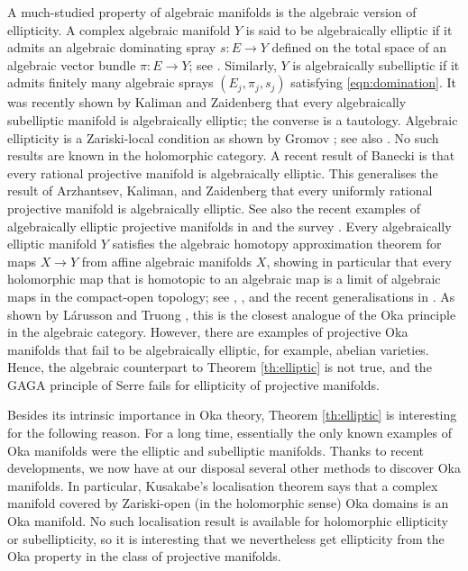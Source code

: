 \documentclass[12pt]{amsart}
\theoremstyle{definition}
\numberwithin{equation}{section}
\numberwithin{figure}{section}
\numberwithin{equation}{section}
\begin{document}
%
%
A much-studied property of algebraic manifolds
is the algebraic version of ellipticity.
A complex algebraic manifold $Y$ is said to be algebraically
elliptic if it admits an algebraic dominating spray $s:E\to Y$
defined on the total space of an algebraic vector bundle
$\pi:E\to Y$; see \cite[Definition 5.6.13 (e)]{Forstneric2017E}.
Similarly, $Y$ is algebraically subelliptic if it admits 
finitely many algebraic sprays $(E_j,\pi_j,s_j)$ satisfying 
\eqref{eqn:domination}. It was recently shown by Kaliman and Zaidenberg
\cite{KalimanZaidenberg2024FM} that every algebraically subelliptic 
manifold is algebraically elliptic; the converse is a tautology. 
Algebraic ellipticity is a Zariski-local condition as shown by 
Gromov \cite[3.5.B, 3.5.C]{Gromov1989}; see also 
\cite[Proposition 6.4.2]{Forstneric2017E}.
No such results are known in the holomorphic category.
A recent result of Banecki \cite{Banecki2024X} is that 
every rational projective manifold is algebraically elliptic.
This generalises the result of Arzhantsev, Kaliman, and Zaidenberg 
\cite[Theorem 1.3]{ArzhantsevKalimanZaidenberg2024}
that every uniformly rational projective manifold is algebraically
elliptic. See also the recent examples of algebraically elliptic
projective manifolds in 
\cite{KalimanZaidenberg2024MRL,KalimanZaidenberg2025}
and the survey \cite{Zaidenberg2024ellipticitysurvey}.
Every algebraically elliptic manifold $Y$ satisfies the algebraic 
homotopy approximation theorem for maps $X\to Y$ from 
affine algebraic manifolds $X$,
showing in particular that every holomorphic map that is homotopic
to an algebraic map is a limit of algebraic maps in the compact-open
topology; see \cite[Theorem 3.1]{Forstneric2006AJM}, 
\cite[Theorem 6.15.1]{Forstneric2017E}, and the recent 
generalisations in \cite[Sect.\ 2]{AlarconForstnericLarusson2024}.
As shown by L\'arusson and Truong \cite{LarussonTruong2019},
this is the closest analogue of the Oka principle in the algebraic
category. However, there are examples of projective Oka manifolds 
that fail to be algebraically elliptic, for example, abelian varieties. 
Hence, the algebraic counterpart
to Theorem \ref{th:elliptic} is not true, and the GAGA principle
of Serre \cite{Serre1955AIF} fails for ellipticity of projective manifolds.

Besides its intrinsic importance in Oka theory, Theorem \ref{th:elliptic}
is interesting for the following reason. For a long time, essentially 
the only known examples of Oka manifolds were the elliptic and subelliptic 
manifolds. Thanks to recent developments, we now have at our disposal 
several other methods to discover Oka manifolds. 
In particular, Kusakabe's localisation theorem
\cite[Theorem 1.4]{Kusakabe2021IUMJ} says that a complex manifold
covered by Zariski-open (in the holomorphic sense)
Oka domains is an Oka manifold.
No such localisation result is available for holomorphic ellipticity or subellipticity, 
so it is interesting that we nevertheless get ellipticity from the Oka property 
in the class of projective manifolds.
\end{document}
